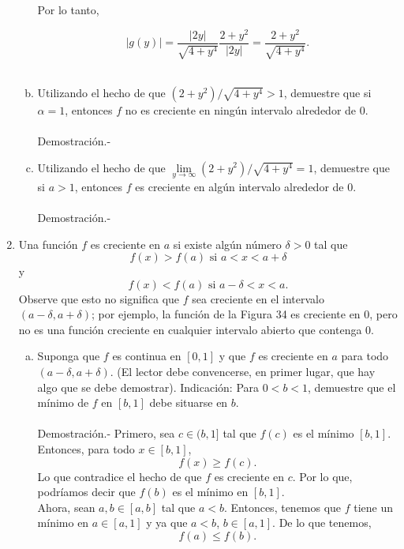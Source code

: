 \begin{enumerate}[\bfseries 1.]
\begin{enumerate}[(a)]
		Por lo tanto,

		$$|g(y)|=\dfrac{|2y|}{\sqrt{4+y^4}}\dfrac{2+y^2}{|2y|}=\dfrac{2+y^2}{\sqrt{4+y^4}}.$$\\


	    \item Utilizando el hecho de que $(2+y^2)/\sqrt{4+y^4}>1$, demuestre que si $\alpha=1$, entonces $f$ no es creciente en ningún intervalo alrededor de $0$.\\\\
		Demostración.-\;

	    \item Utilizando el hecho de que $\lim\limits_{y\to \infty}\left(2+y^2\right)/\sqrt{4+y^4}=1$, demuestre que si $a>1$, entonces $f$ es creciente en algún intervalo alrededor de $0$.\\\\
		Demostración.-\;

	\end{enumerate}


    \item Una función $f$ es creciente en $a$ si existe algún número $\delta>0$ tal que
    $$f(x)>f(a)\mbox{ si } a<x<a+\delta$$
    y
    $$f(x)<f(a)\mbox{ si }a-\delta<x<a.$$
    Observe que esto no significa que $f$ sea creciente en el intervalo $(a - \delta, a + \delta)$; por ejemplo, la función de la Figura 34 es creciente en $0$, pero no es una función creciente en cualquier intervalo abierto que contenga $0$.\\

	\begin{enumerate}[(a)]

	    \item Suponga que $f$ es continua en $[0,1]$ y que $f$ es creciente en $a$ para todo $(a-\delta,a+\delta)$. (El lector debe convencerse, en primer lugar, que hay algo que se debe demostrar). Indicación: Para $0<b<1$, demuestre que el mínimo de $f$ en $[b,1]$ debe situarse en $b$.\\\\
		Demostración.-\; Primero, sea $c\in(b,1]$ tal que $f(c)$ es el mínimo $[b,1].$ Entonces, para todo $x\in [b,1]$,
		$$f(x)\geq f(c).$$
		Lo que contradice el hecho de que $f$ es creciente en $c$. Por lo que, podríamos decir que $f(b)$ es el mínimo en $[b,1]$.\\
		Ahora, sean $a,b\in [a,b]$ tal que $a<b$. Entonces, tenemos que $f$ tiene un mínimo en $a\in [a,1]$ y ya que $a<b$, $b\in [a,1]$. De lo que tenemos,
		$$f(a)\leq f(b).$$


\end{enumerate}
\end{enumerate}
